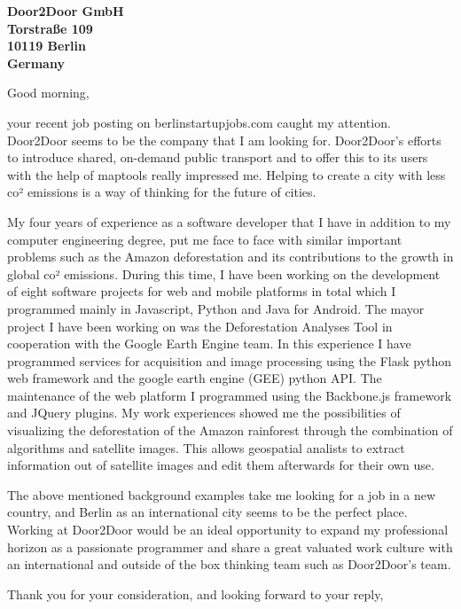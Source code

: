 \documentclass[a4paper]{joaosoares-letter}
\begin{document}

\begin{letter}{\bfseries
Door2Door GmbH\\Torstraße 109\\10119 Berlin\\Germany}
\opening{Good morning,}

your recent job posting on berlinstartupjobs.com caught my attention. Door2Door seems to be the company that I am looking for. Door2Door’s efforts to introduce shared, on-demand public transport and to offer this to its users with the help of maptools really impressed me. Helping to create a city with less co² emissions is a way of thinking for the future of cities. 

My four years of experience as a software developer that I have in addition to my computer engineering degree, put me face to face with similar important problems such as the Amazon deforestation and its contributions to the growth in global co² emissions. During this time, I have been working on the development of eight software projects for web and mobile platforms in total which I programmed mainly in Javascript, Python and Java for Android. The mayor project I have been working on was the Deforestation Analyses Tool in cooperation with the Google Earth Engine team. In this experience I have programmed services for acquisition and image processing using the Flask python web framework and the google earth engine (GEE) python API. The maintenance of the web platform I programmed using the Backbone.js framework and JQuery plugins. My work experiences showed me the possibilities of visualizing the deforestation of the Amazon rainforest through the combination of algorithms and satellite images. This allows geospatial analists to extract information out of satellite images and edit them afterwards for their own use.

The above mentioned background examples take me looking for a job in a new country, and Berlin as an international city seems to be the perfect place. Working at Door2Door would be an ideal opportunity to expand my professional horizon as a passionate programmer and share a great valuated work culture with an international and outside of the box thinking team such as Door2Door’s team. 

\closing{Thank you for your consideration, and looking forward to your reply,}
\end{letter}
\end{document}
